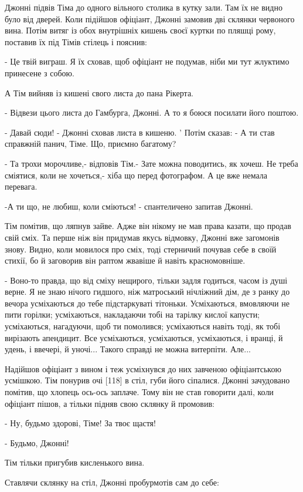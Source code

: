 Джонні підвів Тіма до одного вільного столика в кутку зали. Там їх не видно було від дверей. Коли підійшов офіціант, Джонні замовив дві склянки червоного вина. Потім витяг із обох внутрішніх кишень своєї куртки по пляшці рому, поставив їх під Тімів стілець і пояснив:

- Це твій виграш. Я їх сховав, щоб офіціант не подумав, ніби ми тут жлуктимо принесене з собою.

А Тім вийняв із кишені свого листа до пана Рікерта.

- Відвези цього листа до Гамбурга, Джонні. А то я боюся посилати його поштою.

- Давай сюди! - Джонні сховав листа в кишеню. ' Потім сказав: - А ти став справжній панич, Тіме. Що, приємно багатому?

- Та трохи морочливе,- відповів Тім.- Зате можна поводитись, як хочеш. Не треба сміятися, коли не хочеться,- хіба що перед фотографом. А це вже немала перевага.

-А ти що, не любиш, коли сміються! - спантеличено запитав Джонні.

Тім помітив, що ляпнув зайве. Адже він нікому не мав права казати, що продав свій сміх. Та перше ніж він придумав якусь відмовку, Джонні вже загомонів знову. Видно, коли мовилося про сміх, тоді стерничий почував себе в своїй стихії, бо й заговорив він раптом жвавіше й навіть красномовніше.

- Воно-то правда, що від сміху нещирого, тільки задля годиться, часом із душі верне. Я не знаю нічого гидшого, ніж матроський нічліжний дім, де з ранку до вечора усміхаються до тебе підстаркуваті тітоньки. Усміхаються, вмовляючи не пити горілки; усміхаються, накладаючи тобі на тарілку кислої капусти; усміхаються, нагадуючи, щоб ти помолився; усміхаються навіть тоді, як тобі вирізають апендицит. Все усміхаються, усміхаються, усміхаються, і вранці, й удень, і ввечері, й уночі... Такого справді не можна витерпіти. Але...

Надійшов офіціант з вином і теж усміхнувся до них завченою офіціантською усмішкою. Тім понурив очі [118] в стіл, губи його сіпалися. Джонні зачудовано помітив, що хлопець ось-ось заплаче. Тому він не став говорити далі, коли офіціант пішов, а тільки підняв свою склянку й промовив:

- Ну, будьмо здорові, Тіме! За твоє щастя!

- Будьмо, Джонні!

Тім тільки пригубив кисленького вина.

Ставлячи склянку на стіл, Джонні пробурмотів сам до себе:

